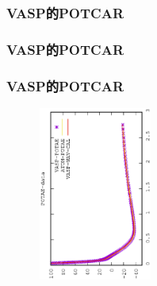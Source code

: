 \frame
{
	\frametitle{\rm{VASP}的\rm{POTCAR}}
\centering
\vspace{-0.15in}
\fontsize{4.8pt}{4.2pt}\selectfont{
}
}

\frame
{
	\frametitle{\rm{VASP}的\rm{POTCAR}}
\begin{minipage}{0.58\textwidth}
\centering
\vspace{-0.10in}
\fontsize{3.3pt}{1.9pt}\selectfont{
}
\end{minipage}
\hfill
\begin{minipage}{0.40\textwidth}
{\fontsize{8.2pt}{6.2pt}}
\end{minipage}
}

\frame
{
	\frametitle{\rm{VASP}的\rm{POTCAR}}
\begin{minipage}{0.58\textwidth}
\centering
\vspace{-0.10in}
\fontsize{3.3pt}{1.9pt}\selectfont{
}
\end{minipage}
\hfill
\begin{minipage}{0.40\textwidth}
\begin{figure}[t!]
\centering
\vspace{-0.05in}
\includegraphics[height=2.25in,width=1.5in,viewport=0 0 350 550, angle=-90, clip]{Figures/POTAE-data.eps}
\label{Potential_Function}
\end{figure}
\end{minipage}
}

